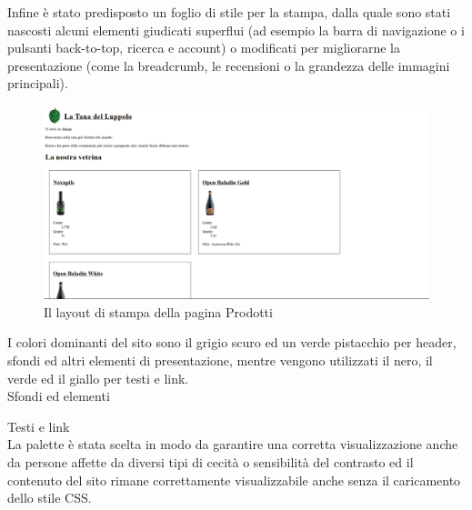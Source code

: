 \pagebreak

Infine è stato predisposto un foglio di stile per la stampa, dalla quale sono stati nascosti alcuni elementi giudicati superflui (ad esempio la barra di navigazione o i pulsanti back-to-top, ricerca e account) o modificati per migliorarne la presentazione (come la breadcrumb, le recensioni o la grandezza delle immagini principali).

\begin{figure}[H]
	\centering
	\includegraphics[width=16cm]{utility/prodotti_printcss.png}
	\caption{Il layout di stampa della pagina Prodotti}
\end{figure}

I colori dominanti del sito sono il grigio scuro ed un verde pistacchio per header, sfondi ed altri elementi di presentazione, mentre vengono utilizzati il nero, il verde ed il giallo per testi e link.\\

Sfondi ed elementi
\crule[hdgray]{1cm}{1cm} \crule[pistacho]{1cm}{1cm} \crule[puffo]{1cm}{1cm} 


Testi e link
\crule{1cm}{1cm} \crule[yellow]{1cm}{1cm} \crule[bcgreen]{1cm}{1cm} \crule[hdgreen]{1cm}{1cm}
\\

La palette è stata scelta in modo da garantire una corretta visualizzazione anche da persone affette da diversi tipi di cecità o sensibilità del contrasto ed il contenuto del sito rimane correttamente visualizzabile anche senza il caricamento dello stile CSS.

